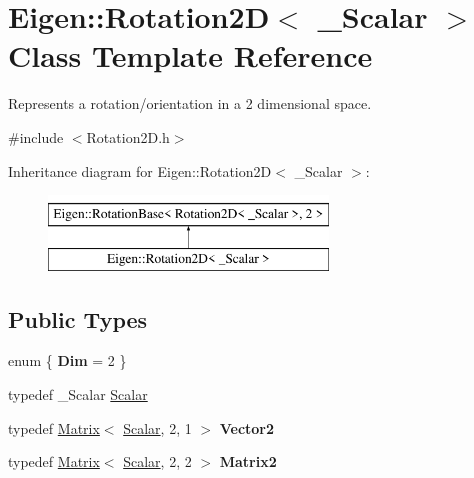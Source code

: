 \hypertarget{class_eigen_1_1_rotation2_d}{}\section{Eigen\+::Rotation2D$<$ \+\_\+\+Scalar $>$ Class Template Reference}
\label{class_eigen_1_1_rotation2_d}


Represents a rotation/orientation in a 2 dimensional space.  




{\ttfamily \#include $<$Rotation2\+D.\+h$>$}

Inheritance diagram for Eigen\+::Rotation2D$<$ \+\_\+\+Scalar $>$\+:\begin{figure}[H]
\begin{center}
\leavevmode
\includegraphics[height=2.000000cm]{class_eigen_1_1_rotation2_d}
\end{center}
\end{figure}
\subsection*{Public Types}
\begin{DoxyCompactItemize}
\item 
\mbox{\label{class_eigen_1_1_rotation2_d_afe790ba3c662ff7c23acd28c9012df7b}} 
enum \{ {\bfseries Dim} = 2
 \}
\item 
typedef \+\_\+\+Scalar \mbox{\hyperlink{class_eigen_1_1_rotation2_d_ac20c665ece0f197a712a2a39ae72e4e4}{Scalar}}
\item 
\mbox{\label{class_eigen_1_1_rotation2_d_a567fea947249da1b60f04fbdb9ee0937}} 
typedef \mbox{\hyperlink{class_eigen_1_1_matrix}{Matrix}}$<$ \mbox{\hyperlink{class_eigen_1_1_rotation2_d_ac20c665ece0f197a712a2a39ae72e4e4}{Scalar}}, 2, 1 $>$ {\bfseries Vector2}
\item 
\mbox{\label{class_eigen_1_1_rotation2_d_a7dfee2f0374e8efd7e5e9b027f952213}} 
typedef \mbox{\hyperlink{class_eigen_1_1_matrix}{Matrix}}$<$ \mbox{\hyperlink{class_eigen_1_1_rotation2_d_ac20c665ece0f197a712a2a39ae72e4e4}{Scalar}}, 2, 2 $>$ {\bfseries Matrix2}
\end{DoxyCompactItemize}
